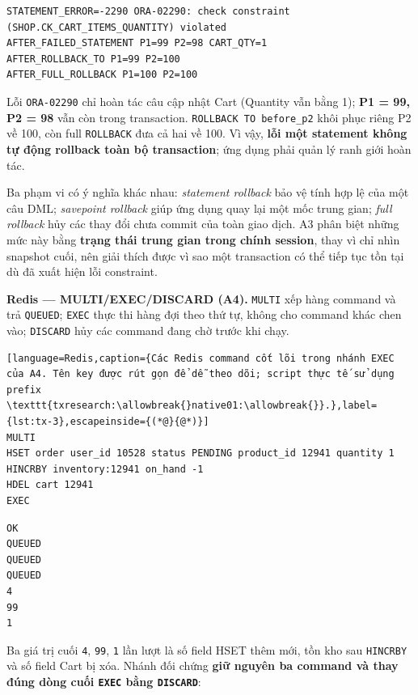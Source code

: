 \begingroup
{}\label{result:tx-1}
\nopagebreak[4]
\begin{Verbatim}
STATEMENT_ERROR=-2290 ORA-02290: check constraint
(SHOP.CK_CART_ITEMS_QUANTITY) violated
AFTER_FAILED_STATEMENT P1=99 P2=98 CART_QTY=1
AFTER_ROLLBACK_TO P1=99 P2=100
AFTER_FULL_ROLLBACK P1=100 P2=100
\end{Verbatim}
\endgroup\par\smallskip
Lỗi \texttt{ORA-\allowbreak{}02290} chỉ hoàn tác câu cập nhật Cart (Quantity vẫn bằng 1); \textbf{P1 = 99, P2 = 98} vẫn còn trong transaction. \texttt{ROLLBACK TO before\_\allowbreak{}p2} khôi phục riêng P2 về 100, còn full \texttt{ROLLBACK} đưa cả hai về 100. Vì vậy, \textbf{lỗi một statement không tự động rollback toàn bộ transaction}; ứng dụng phải quản lý ranh giới hoàn tác.

Ba phạm vi có ý nghĩa khác nhau: \emph{statement rollback} bảo vệ tính hợp lệ của một câu DML; \emph{savepoint rollback} giúp ứng dụng quay lại một mốc trung gian; \emph{full rollback} hủy các thay đổi chưa commit của toàn giao dịch. A3 phân biệt những mức này bằng \textbf{trạng thái trung gian trong chính session}, thay vì chỉ nhìn snapshot cuối, nên giải thích được vì sao một transaction có thể tiếp tục tồn tại dù đã xuất hiện lỗi constraint.

\textbf{Redis — MULTI/EXEC/DISCARD (A4).} \texttt{MULTI} xếp hàng command và trả \texttt{QUEUED}; \texttt{EXEC} thực thi hàng đợi theo thứ tự, không cho command khác chen vào; \texttt{DISCARD} hủy các command đang chờ trước khi chạy.

\begin{lstlisting}[language=Redis,caption={Các Redis command cốt lõi trong nhánh EXEC của A4. Tên key được rút gọn để dễ theo dõi; script thực tế sử dụng prefix \texttt{txresearch:\allowbreak{}native01:\allowbreak{}}.},label={lst:tx-3},escapeinside={(*@}{@*)}]
MULTI
HSET order user_id 10528 status PENDING product_id 12941 quantity 1
HINCRBY inventory:12941 on_hand -1
HDEL cart 12941
EXEC
\end{lstlisting}

\begingroup
{}\label{result:tx-2}
\nopagebreak[4]
\begin{Verbatim}
OK
QUEUED
QUEUED
QUEUED
4
99
1
\end{Verbatim}
\endgroup\par\smallskip
Ba giá trị cuối \texttt{4}, \texttt{99}, \texttt{1} lần lượt là số field HSET thêm mới, tồn kho sau \texttt{HINCRBY} và số field Cart bị xóa. Nhánh đối chứng \textbf{giữ nguyên ba command và thay đúng dòng cuối \texttt{EXEC} bằng \texttt{DISCARD}}:

